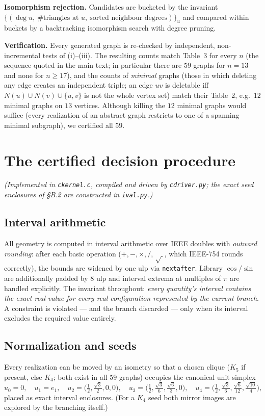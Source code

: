 \documentclass[11pt]{article}
\begin{document}
\textbf{Isomorphism rejection.} Candidates are bucketed by the invariant
$\{(\deg u,\ \#\text{triangles at } u,\ \text{sorted neighbour degrees})\}_u$
and compared within buckets by a backtracking isomorphism search with degree
pruning.

\textbf{Verification.} Every generated graph is re-checked by independent,
non-incremental tests of (i)--(iii). The resulting counts match \cite{BPSSV}
Table~3 for every $n$ (the sequence quoted in the main text; in particular
there are $59$ graphs for $n=13$ and none for $n\ge 17$), and the counts of
\emph{minimal} graphs (those in which deleting any edge creates an independent
triple; an edge $uv$ is deletable iff $N(u)\cup N(v)\cup\{u,v\}$ is not the
whole vertex set) match their Table~2, e.g.\ $12$ minimal graphs on $13$
vertices. Although killing the $12$ minimal graphs would suffice (every
realization of an abstract graph restricts to one of a spanning minimal
subgraph), we certified all $59$.

\section{The certified decision procedure}
\label{app:engine}

\emph{(Implemented in \texttt{ckernel.c}, compiled and driven by
\texttt{cdriver.py}; the exact seed enclosures of \S B.2 are constructed in
\texttt{ival.py}.)}

\subsection{Interval arithmetic}
All geometry is computed in interval arithmetic over IEEE doubles with
\emph{outward rounding}: after each basic operation ($+,-,\times,/$,
$\sqrt{\ }$, which IEEE-754 rounds correctly), the bounds are widened by one
ulp via \texttt{nextafter}. Library $\cos/\sin$ are additionally padded by $8$
ulp and interval extrema at multiples of $\pi$ are handled explicitly. The
invariant throughout: \emph{every quantity's interval contains the exact real
value for every real configuration represented by the current branch}. A
constraint is violated --- and the branch discarded --- only when its interval
excludes the required value entirely.

\subsection{Normalization and seeds}
Every realization can be moved by an isometry so that a chosen clique
($K_5$ if present, else $K_4$; both exist in all $59$ graphs) occupies the
canonical unit simplex
\[
u_0=0,\quad u_1=e_1,\quad u_2=\bigl(\tfrac12,\tfrac{\sqrt3}{2},0,0\bigr),\quad
u_3=\bigl(\tfrac12,\tfrac{\sqrt3}{6},\tfrac{\sqrt6}{3},0\bigr),\quad
u_4=\bigl(\tfrac12,\tfrac{\sqrt3}{6},\tfrac{\sqrt6}{12},\tfrac{\sqrt{10}}{4}\bigr),
\]
placed as exact interval enclosures. (For a $K_4$ seed both mirror images are
explored by the branching itself.)
\end{document}
